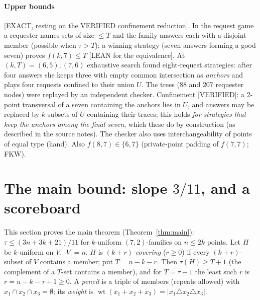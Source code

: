 \documentclass[11pt]{article}
\theoremstyle{definition}
\newcommand{\st}[1]{\textsf{\small[#1]}}
\newcommand{\wt}{\operatorname{wt}}
\begin{document}
\paragraph{Upper bounds} \st{EXACT, resting on the VERIFIED confinement reduction}. In the request game a requester
names sets of size $\le T$ and the family answers each with a disjoint member (possible when $\tau>T$); a winning
strategy (seven answers forming a good seven) proves $f(k,7)\le T$ \st{LEAN for the equivalence}. At $(k,T)=(6,5),(7,6)$
exhaustive search found eight-request strategies: after four answers she keeps three with empty common intersection as
\emph{anchors} and plays four requests confined to their union $U$. The trees ($88$ and $207$ requester nodes) were
replayed by an independent checker. Confinement \st{VERIFIED}: a 2-point transversal of a seven containing the anchors
lies in $U$, and answers may be replaced by $k$-subsets of $U$ containing their traces; this holds \emph{for strategies
that keep the anchors among the final seven}, which these do by construction (as described in the source notes). The
checker also uses interchangeability of points of equal type (hand). Also $f(8,7)\in\{6,7\}$ (private-point padding
of $f(7,7)$; FKW).

\section{The main bound: slope \texorpdfstring{$3/11$}{3/11}, and a scoreboard}\label{sec:score}

This section proves the main theorem (Theorem~\ref{thm:main}): $\tau\le(3n+3k+21)/11$ for $k$-uniform
$(7,2)$-families on $n\le2k$ points. Let $H$ be $k$-uniform on $V$, $|V|=n$. $H$ is \emph{$(k+r)$-covering} ($r\ge0$) if every $(k+r)$-subset of $V$
contains a member; put $T=n-k-r$. Then $\tau(H)\ge T+1$ (the complement of a $T$-set contains a member), and for
$T=\tau-1$ the least such $r$ is $r=n-k-\tau+1\ge0$. A \emph{pencil} is a triple of members (repeats allowed) with
$x_1\cap x_2\cap x_3=\emptyset$; its \emph{weight} is $\wt(x_1+x_2+x_3)=|x_1\triangle x_2\triangle x_3|$.
\end{document}
